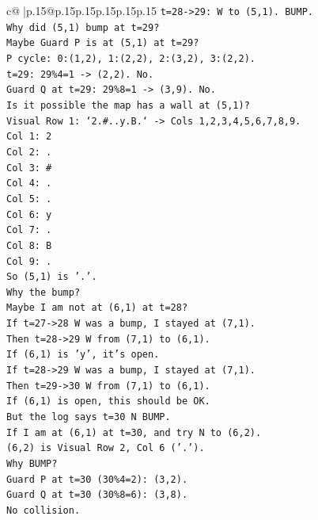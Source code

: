 \documentclass{article}
\begin{document}
{\begin{supertabular}{c@{$\;$}|p{.15\linewidth}@{}p{.15\linewidth}p{.15\linewidth}p{.15\linewidth}p{.15\linewidth}p{.15\linewidth}}
{{{\texttt{t=28{-}>29: W to (5,1). BUMP.} \\
\texttt{Why did (5,1) bump at t=29?} \\
\texttt{Maybe Guard P is at (5,1) at t=29?} \\
\texttt{P cycle: 0:(1,2), 1:(2,2), 2:(3,2), 3:(2,2).} \\
\texttt{t=29: 29\%4=1 {-}> (2,2). No.} \\
\texttt{Guard Q at t=29: 29\%8=1 {-}> (3,9). No.} \\
\texttt{Is it possible the map has a wall at (5,1)?} \\
\texttt{Visual Row 1: `2.\#..y.B.` {-}> Cols 1,2,3,4,5,6,7,8,9.} \\
\texttt{Col 1: 2} \\
\texttt{Col 2: .} \\
\texttt{Col 3: \#} \\
\texttt{Col 4: .} \\
\texttt{Col 5: .} \\
\texttt{Col 6: y} \\
\texttt{Col 7: .} \\
\texttt{Col 8: B} \\
\texttt{Col 9: .} \\
\texttt{So (5,1) is '.'.} \\
\texttt{Why the bump?} \\
\texttt{Maybe I am not at (6,1) at t=28?} \\
\texttt{If t=27{-}>28 W was a bump, I stayed at (7,1).} \\
\texttt{Then t=28{-}>29 W from (7,1) to (6,1).} \\
\texttt{If (6,1) is 'y', it's open.} \\
\texttt{If t=28{-}>29 W was a bump, I stayed at (7,1).} \\
\texttt{Then t=29{-}>30 W from (7,1) to (6,1).} \\
\texttt{If (6,1) is open, this should be OK.} \\
\texttt{But the log says t=30 N BUMP.} \\
\texttt{If I am at (6,1) at t=30, and try N to (6,2).} \\
\texttt{(6,2) is Visual Row 2, Col 6 ('.').} \\
\texttt{Why BUMP?} \\
\texttt{Guard P at t=30 (30\%4=2): (3,2).} \\
\texttt{Guard Q at t=30 (30\%8=6): (3,8).} \\
\texttt{No collision.} \\
}}}
\end{supertabular}}
\end{document}
